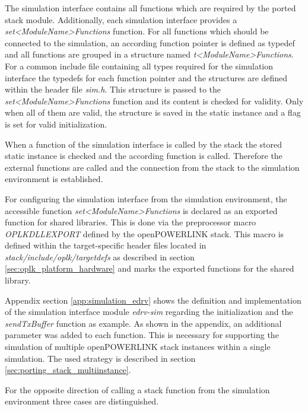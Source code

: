 \begin{sloppypar}
The simulation interface contains all functions which are required by the ported stack module.
Additionally, each simulation interface provides a \emph{set<ModuleName>Functions} function.
For all functions which should be connected to the simulation, an according function pointer is defined as typedef and all functions are grouped in a structure named \emph{t<ModuleName>Functions}.
For a common include file containing all types required for the simulation interface the typedefs for each function pointer and the structures are defined within the header file \emph{sim.h}.
This structure is passed to the \emph{set<ModuleName>Functions} function and its content is checked for validity.
Only when all of them are valid, the structure is saved in the static instance and a flag is set for valid initialization.
\end{sloppypar}

When a function of the simulation interface is called by the stack the stored static instance is checked and the according function is called.
Therefore the external functions are called and the connection from the stack to the simulation environment is established.

For configuring the simulation interface from the simulation environment, the accessible function \emph{set<ModuleName>Functions} is declared as an exported function for shared libraries.
This is done via the preprocessor macro \emph{OPLKDLLEXPORT} defined by the openPOWERLINK stack.
This macro is defined within the target-specific header files located in \emph{stack/include/oplk/targetdefs} as described in section \ref{sec:oplk_platform_hardware} and marks the exported functions for the shared library.

Appendix section \ref{app:simulation_edrv} shows the definition and implementation of the simulation interface module \emph{edrv-sim} regarding the initialization and the \emph{sendTxBuffer} function as example.
As shown in the appendix, an additional parameter was added to each function.
This is necessary for supporting the simulation of multiple openPOWERLINK stack instances within a single simulation.
The used strategy is described in section \ref{sec:porting_stack_multiinstance}.

For the opposite direction of calling a stack function from the simulation environment three cases are distinguished.

